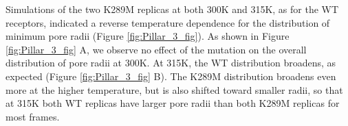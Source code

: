 \documentclass[journal=jacsat,manuscript=article]{achemso}
\newcommand{\WT}{WT\xspace}
\newcommand{\MT}{K289M\xspace}
\begin{document}
Simulations of the two \MT replicas at both 300K and 315K, as for the \WT receptors, indicated a reverse temperature dependence for the distribution of minimum pore radii  (Figure \ref{fig:Pillar_3_fig}).  %
As shown in Figure \ref{fig:Pillar_3_fig} A, we observe no effect of the mutation on the overall distribution of pore radii at 300K.  At 315K, the \WT distribution broadens, as expected (Figure \ref{fig:Pillar_3_fig} B).  The \MT distribution broadens even more at the higher temperature,  but is also shifted toward smaller radii, so that at 315K both \WT replicas have larger pore radii than both \MT replicas for most frames. 
\end{document}
